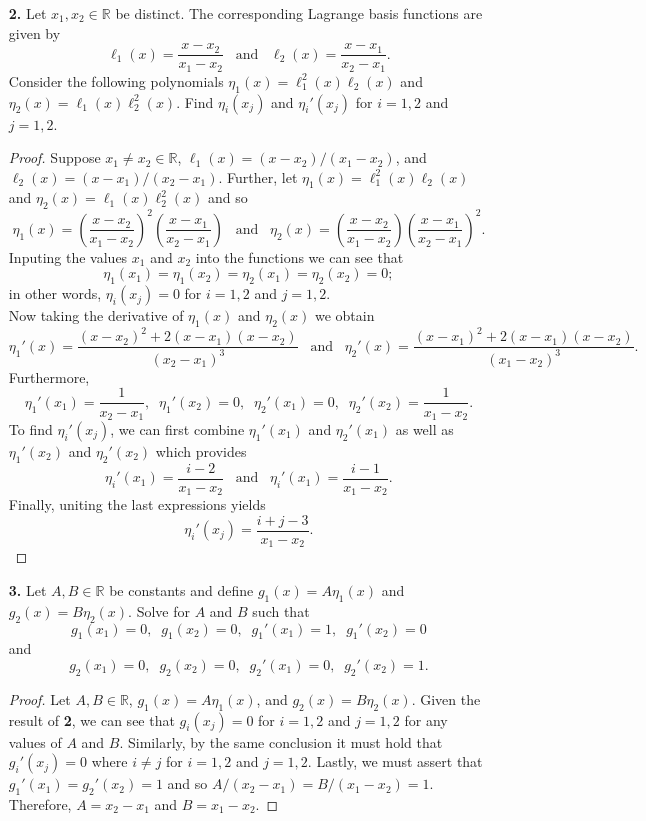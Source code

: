 \documentclass[ 12pt ]{article}
\begin{document}
\begin{enumerate}
	\item[\textbf{2.}] Let $x_1, x_2 \in \mathbb{R}$ be distinct. The corresponding Lagrange basis functions are given by $$\ell_1(x) = \frac{x - x_2}{x_1 - x_2}\;\;\; \mathrm{and}\;\;\; \ell_2(x) = \frac{x - x_1}{x_2 - x_1}.$$ Consider the following polynomials $\eta_1(x) = \ell_1^2(x) \ell_2(x)$ and $\eta_2(x) = \ell_1(x) \ell_2^2(x)$. Find $\eta_i(x_j)$ and $\eta_i'(x_j)$ for $i = 1, 2$ and $j = 1, 2$.

	\begin{proof}
		Suppose $x_1 \neq x_2 \in \mathbb{R}$, $\ell_1(x) = (x-x_2) / (x_1 - x_2)$, and $\ell_2(x) = (x - x_1) / (x_2 - x_1)$. Further, let $\eta_1(x) = \ell_1^2(x) \ell_2(x)$ and $\eta_2(x) = \ell_1(x) \ell_2^2(x)$ and so $$\eta_1(x) = \left ( \frac{x - x_2}{x_1 - x_2} \right )^2 \left ( \frac{x - x_1}{x_2 - x_1} \right )\;\;\; \mathrm{and}\;\;\; \eta_2(x) = \left ( \frac{x - x_2}{x_1 - x_2} \right ) \left ( \frac{x - x_1}{x_2 - x_1} \right )^2.$$ Inputing the values $x_1$ and $x_2$ into the functions we can see that $$\eta_1(x_1) = \eta_1(x_2) = \eta_2(x_1) = \eta_2(x_2) = 0;$$ in other words, $\eta_i(x_j) = 0$ for $i = 1, 2$ and $j = 1, 2$. \\
		Now taking the derivative of $\eta_1(x)$ and $\eta_2(x)$ we obtain $$\eta_1'(x) = \frac{(x - x_2)^2 + 2(x - x_1)(x - x_2)}{(x_2 - x_1)^3}\;\;\; \mathrm{and}\;\;\; \eta_2'(x) = \frac{(x - x_1)^2 + 2(x - x_1)(x - x_2)}{(x_1 - x_2)^3}.$$ Furthermore, $$\eta_1'(x_1) = \frac{1}{x_2 - x_1},\;\; \eta_1'(x_2) = 0,\;\; \eta_2'(x_1) = 0,\;\; \eta_2'(x_2) = \frac{1}{x_1 - x_2}.$$ To find $\eta_i'(x_j)$, we can first combine $\eta_1'(x_1)$ and $\eta_2'(x_1)$ as well as $\eta_1'(x_2)$ and $\eta_2'(x_2)$ which provides $$\eta_i'(x_1) = \frac{i - 2}{x_1 - x_2}\;\;\; \mathrm{and}\;\;\; \eta_i'(x_1) = \frac{i - 1}{x_1 - x_2}.$$ Finally, uniting the last expressions yields $$\eta_i'(x_j) = \frac{i + j - 3}{x_1 - x_2}.$$
	\end{proof}

	\item[\textbf{3.}] Let $A, B \in \mathbb{R}$ be constants and define $g_1(x) = A\eta_1(x)$ and $g_2(x) = B\eta_2(x)$. Solve for $A$ and $B$ such that $$g_1(x_1) = 0,\;\; g_1(x_2) = 0,\;\; g_1'(x_1) = 1,\;\; g_1'(x_2) = 0$$ and $$g_2(x_1) = 0,\;\; g_2(x_2) = 0,\;\; g_2'(x_1) = 0,\;\; g_2'(x_2) = 1.$$

	\begin{proof}
		Let $A, B \in \mathbb{R}$, $g_1(x) = A\eta_1(x)$, and $g_2(x) = B\eta_2(x)$. Given the result of \textbf{2}, we can see that $g_i(x_j) = 0$ for $i = 1, 2$ and $j = 1, 2$ for any values of $A$ and $B$. Similarly, by the same conclusion it must hold that $g_i'(x_j) = 0$ where $i \neq j$ for $i = 1, 2$ and $j = 1, 2$. Lastly, we must assert that $g_1'(x_1) = g_2'(x_2) = 1$ and so $A / (x_2 - x_1) = B / (x_1 - x_2) = 1$. Therefore, $A = x_2 - x_1$ and $B = x_1 - x_2$.
	\end{proof}


\end{enumerate}
\end{document}
